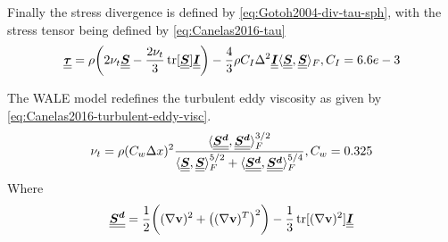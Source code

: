 Finally the stress divergence is defined by \ref{eq:Gotoh2004-div-tau-sph}, with the stress tensor being defined by \ref{eq:Canelas2016-tau}
\begin{equation}
	\underline{\underline{\bm{\tau}}} = \rho \bigg( 2\nu_t \underline{\underline{\bm{S}}} - \frac{2 \nu_t}{3}\operatorname{tr}[\underline{\underline{\bm{S}}}]\underline{\underline{\bm{I}}} \bigg) - \frac{4}{3} \rho C_I \Delta^2 \underline{\underline{\bm{I}}} \langle \underline{\underline{\bm{S}}}, \underline{\underline{\bm{S}}} \rangle_F, C_I = 6.6e-3
	\label{eq:Canelas2016-tau}
\end{equation}

The WALE model redefines the turbulent eddy viscosity as given by \ref{eq:Canelas2016-turbulent-eddy-visc}.
\begin{equation}
	\nu_t = \rho (C_w \Delta x)^2 \frac{\langle \underline{\underline{\bm{S^d}}}, \underline{\underline{\bm{S^d}}} \rangle_F^{3/2}}{\langle \underline{\underline{\bm{S}}}, \underline{\underline{\bm{S}}} \rangle_F^{5/2} + \langle \underline{\underline{\bm{S^d}}}, \underline{\underline{\bm{S^d}}} \rangle_F^{5/4}}, C_w=0.325
	\label{eq:Canelas2016-turbulent-eddy-visc}
\end{equation}
Where
\begin{equation}
	\underline{\underline{\bm{S^d}}} = \frac{1}{2} \bigg( (\nabla \mathbf{v})^2 + \big((\nabla \mathbf{v})^T\big)^2 \bigg) - \frac{1}{3} \operatorname{tr}[(\nabla \mathbf{v})^2] \underline{\underline{\bm{I}}}
\end{equation}

